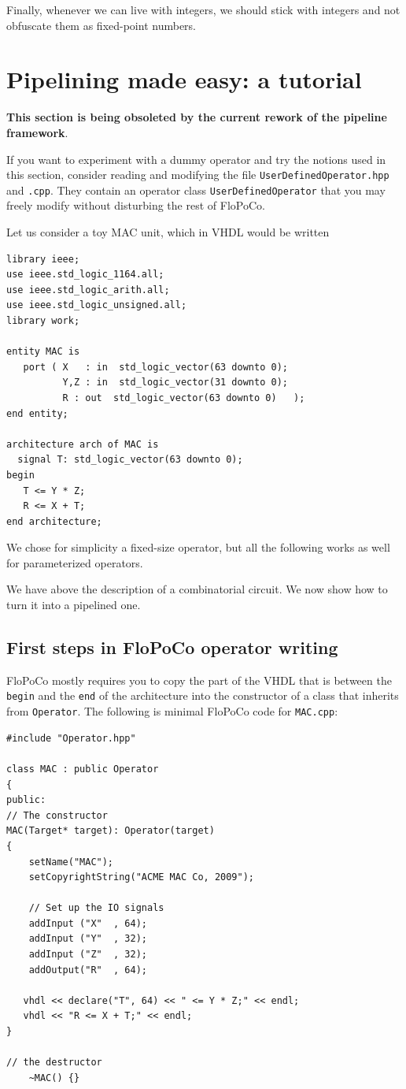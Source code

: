 \documentclass{article}
\begin{document}
Finally, whenever we can live with integers, we should stick with integers and not obfuscate them as fixed-point numbers.

\section{Pipelining made easy: a tutorial \label{sec:pipeline-made-easy}}
\label{sec:pme}

\textbf{This section is being obsoleted by the current rework of the pipeline framework}.

If you want to experiment with a dummy operator and try the notions
used in this section, consider reading and modifying the file
\texttt{UserDefinedOperator.hpp} and \texttt{.cpp}. They contain an
operator class \texttt{UserDefinedOperator} that you may freely modify
without disturbing the rest of FloPoCo.


Let us consider a toy MAC unit, which in VHDL would be written
\begin{verbatim}
library ieee;
use ieee.std_logic_1164.all;
use ieee.std_logic_arith.all;
use ieee.std_logic_unsigned.all;
library work;

entity MAC is
   port ( X   : in  std_logic_vector(63 downto 0);
          Y,Z : in  std_logic_vector(31 downto 0);
          R : out  std_logic_vector(63 downto 0)   );
end entity;

architecture arch of MAC is
  signal T: std_logic_vector(63 downto 0);
begin
   T <= Y * Z;
   R <= X + T;
end architecture;
\end{verbatim}

We chose for simplicity a fixed-size operator, but all the following
works as well for parameterized operators.

We have above the description of a combinatorial circuit. We now show how to
turn it into a pipelined one.


\subsection{First steps in FloPoCo operator writing}

FloPoCo mostly requires you to copy the part of the VHDL that is
between the \texttt{begin} and the \texttt{end} of the architecture
into the constructor of a class that inherits from
\verb!Operator!. The following is minimal FloPoCo code for
\verb!MAC.cpp!:
\begin{verbatim}
#include "Operator.hpp"

class MAC : public Operator
{
public:
// The constructor
MAC(Target* target): Operator(target)
{
	setName("MAC");
	setCopyrightString("ACME MAC Co, 2009");		

	// Set up the IO signals
	addInput ("X"  , 64);
	addInput ("Y"  , 32);
	addInput ("Z"  , 32);
	addOutput("R"  , 64);

   vhdl << declare("T", 64) << " <= Y * Z;" << endl;
   vhdl << "R <= X + T;" << endl;
}

// the destructor
	~MAC() {}
\end{verbatim}
 
\end{document}
